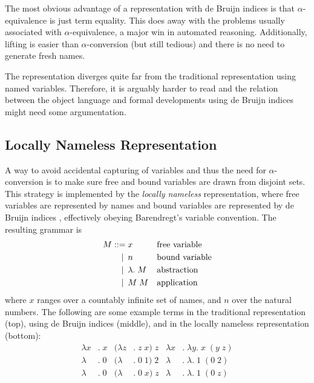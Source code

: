 \documentclass[a4paper,11pt]{article}
\begin{document}
The most obvious advantage of a representation with de Bruijn
indices is that $\alpha$-equivalence is just term equality.
This does away with the problems usually associated with
$\alpha$-equivalence, a major win in automated reasoning.
Additionally, lifting is easier than $\alpha$-conversion (but
still tedious) and there is no need to generate fresh names.

The representation diverges quite far from the traditional
representation using named variables.
Therefore, it is arguably harder to read and the relation
between the object language and formal developments using de
Bruijn indices might need some argumentation.


\subsection{Locally Nameless Representation}

A way to avoid accidental capturing of variables and thus the need for
$\alpha$-conversion is to make sure free and bound variables are drawn
from disjoint sets.
This strategy is implemented by the {\em locally nameless} representation,
where free variables are represented by names and bound variables are
represented by de Bruijn indices \cite{mcbride-mckinna-04}, effectively
obeying Barendregt's variable convention.
The resulting grammar is
\begin{align*}
  M ::=             &\; x
  && \text{free variable} \\
  \llap{\textbar\:} &\; n
  && \text{bound variable} \\
  \llap{\textbar\:} &\; \lambda . \; M
    && \text{abstraction} \\
  \llap{\textbar\:} &\; M \; M
  && \text{application}
\end{align*}
where $x$ ranges over a countably infinite set of names, and $n$ over
the natural numbers.
The following are some example terms in the traditional representation
(top), using de Bruijn indices (middle), and in the locally nameless
representation (bottom):
\begin{align*}
  \lambda x&. \; x & (\lambda z&. \; z \; x) \; z & \lambda x&. \; \lambda y. \; x \; (y \; z)\\
  \lambda &. \; 0  & (\lambda &. \; 0 \; 1) \; 2  & \lambda &. \; \lambda . \; 1 \; (0 \; 2)\\
  \lambda &. \; 0  & (\lambda &. \; 0 \; x) \; z  & \lambda &. \; \lambda . \; 1 \; (0 \; z)
\end{align*}
\end{document}
